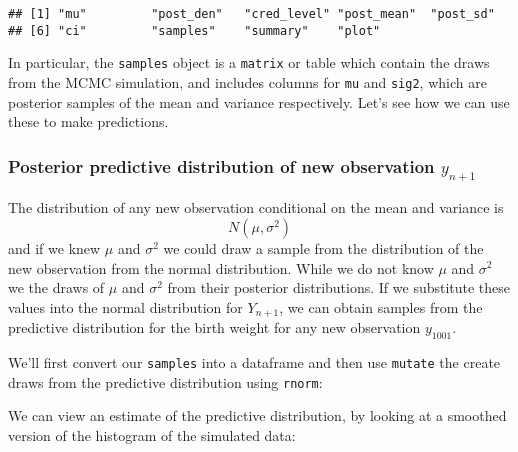 \documentclass[]{article}
\newenvironment{Shaded}{\begin{snugshade}}{\end{snugshade}}
\newcommand{\KeywordTok}[1]{\textcolor[rgb]{0.13,0.29,0.53}{\textbf{#1}}}
\newcommand{\DataTypeTok}[1]{\textcolor[rgb]{0.13,0.29,0.53}{#1}}
\newcommand{\StringTok}[1]{\textcolor[rgb]{0.31,0.60,0.02}{#1}}
\newcommand{\OperatorTok}[1]{\textcolor[rgb]{0.81,0.36,0.00}{\textbf{#1}}}
\newcommand{\NormalTok}[1]{#1}
\begin{document}
\begin{verbatim}
## [1] "mu"         "post_den"   "cred_level" "post_mean"  "post_sd"   
## [6] "ci"         "samples"    "summary"    "plot"
\end{verbatim}

In particular, the \texttt{samples} object is a \texttt{matrix} or table
which contain the draws from the MCMC simulation, and includes columns
for \texttt{mu} and \texttt{sig2}, which are posterior samples of the
mean and variance respectively. Let's see how we can use these to make
predictions.

\subsubsection{\texorpdfstring{Posterior predictive distribution of new
observation
\(y_{n+1}\)}{Posterior predictive distribution of new observation y\_\{n+1\}}}\label{posterior-predictive-distribution-of-new-observation-y_n1}

The distribution of any new observation conditional on the mean and
variance is \[N(\mu, \sigma^2)\] and if we knew \(\mu\) and \(\sigma^2\)
we could draw a sample from the distribution of the new observation from
the normal distribution. While we do not know \(\mu\) and \(\sigma^2\)
we the draws of \(\mu\) and \(\sigma^2\) from their posterior
distributions. If we substitute these values into the normal
distribution for \(Y_{n+1}\), we can obtain samples from the predictive
distribution for the birth weight for any new observation \(y_{1001}\).

We'll first convert our \texttt{samples} into a dataframe and then use
\texttt{mutate} the create draws from the predictive distribution using
\texttt{rnorm}:

\begin{Shaded}
\end{Shaded}

We can view an estimate of the predictive distribution, by looking at a
smoothed version of the histogram of the simulated data:
\end{document}

